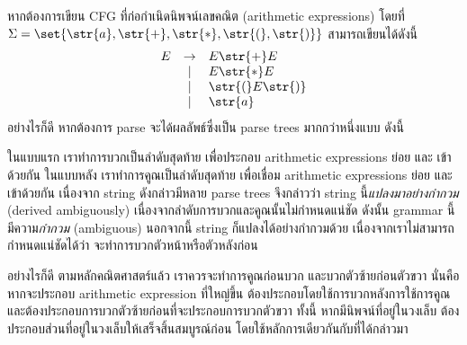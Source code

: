 \begin{example}
หากต้องการเขียน CFG ที่ก่อกำเนิดนิพจน์เลขคณิต (arithmetic expressions) โดยที่ $\Sigma=\set{\str{a},\str{+},\str{*},\str{(},\str{)}}$ สามารถเขียนได้ดังนี้
\[
\begin{array}{ccl}
E
 &\to& E\str{+}E \\
 &\mid& E\str{*}E \\
 &\mid& \str{(}E\str{)} \\
 &\mid& \str{a}
\end{array}
\]
อย่างไรก็ดี หากต้องการ parse  จะได้ผลลัพธ์ซึ่งเป็น parse trees มากกว่าหนึ่งแบบ ดังนี้
\begin{center}
\hfill
{}
%
\hfill
%
\hspace*{\fill}
\end{center}
ในแบบแรก เราทำการบวกเป็นลำดับสุดท้าย เพื่อประกอบ arithmetic expressions ย่อย  และ  เข้าด้วยกัน \enskip ในแบบหลัง เราทำการคูณเป็นลำดับสุดท้าย เพื่อเชื่อม arithmetic expressions ย่อย  และ  เข้าด้วยกัน \enskip เนื่องจาก string ดังกล่าวมีหลาย parse trees จึงกล่าวว่า string  นี้\emph{แปลงมาอย่างกำกวม} (derived ambiguously) เนื่องจากลำดับการบวกและคูณนั้นไม่กำหนดแน่ชัด \enskip ดังนั้น grammar นี้มีความ\emph{กำกวม} (ambiguous) \enskip นอกจากนี้ string  ก็แปลงได้อย่างกำกวมด้วย เนื่องจากเราไม่สามารถกำหนดแน่ชัดได้ว่า จะทำการบวกตัวหน้าหรือตัวหลังก่อน

อย่างไรก็ดี ตามหลักคณิตศาสตร์แล้ว เราควรจะทำการคูณก่อนบวก และบวกตัวซ้ายก่อนตัวขวา \enskip นั่นคือ หากจะประกอบ arithmetic expression ที่ใหญ่ขึ้น ต้องประกอบโดยใช้การบวกหลังการใช้การคูณ และต้องประกอบการบวกตัวซ้ายก่อนที่จะประกอบการบวกตัวขวา ทั้งนี้ หากมีนิพจน์ที่อยู่ในวงเล็บ ต้องประกอบส่วนที่อยู่ในวงเล็บให้เสร็จสิ้นสมบูรณ์ก่อน โดยใช้หลักการเดียวกันกับที่ได้กล่าวมา


\end{example}
